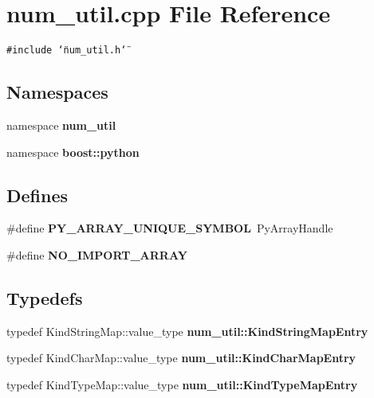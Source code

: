 \section{num\_\-util.cpp File Reference}
\label{num__util_8cpp}
{\tt \#include \char`\"{}num\_\-util.h\char`\"{}}\par
\subsection*{Namespaces}
\begin{CompactItemize}
\item 
namespace {\bf num\_\-util}
\item 
namespace {\bf boost::python}
\end{CompactItemize}
\subsection*{Defines}
\begin{CompactItemize}
\item 
\#define {\bf PY\_\-ARRAY\_\-UNIQUE\_\-SYMBOL}~Py\-Array\-Handle
\item 
\#define {\bf NO\_\-IMPORT\_\-ARRAY}
\end{CompactItemize}
\subsection*{Typedefs}
\begin{CompactItemize}
\item 
typedef Kind\-String\-Map::value\_\-type {\bf num\_\-util::Kind\-String\-Map\-Entry}
\item 
typedef Kind\-Char\-Map::value\_\-type {\bf num\_\-util::Kind\-Char\-Map\-Entry}
\item 
typedef Kind\-Type\-Map::value\_\-type {\bf num\_\-util::Kind\-Type\-Map\-Entry}
\end{CompactItemize}
